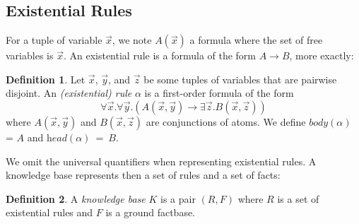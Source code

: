 \documentclass{article}
\newtheorem{proposition}{Proposition}[section]
\theoremstyle{definition}
\newtheorem{definition}{Definition}[section]
\theoremstyle{remark}
\begin{document}




\subsection{Existential Rules}

For a tuple of variable $\vec x$, we note $A(\vec x)$ a formula where the set of free variables is $\vec x$. An existential rule is a formula of the form $A \rightarrow B$, more exactly:

\begin{definition}
Let $\vec x$, $\vec y$, and $\vec z$ be some tuples of variables that are pairwise disjoint. An \emph{(existential) rule} $\alpha$ is a first-order formula	of the form $$\forall \vec x.\forall \vec y.( A(\vec x,\vec y) \rightarrow \exists \vec z. B(\vec x,\vec z))$$ where $A(\vec x,\vec y)$ and $B(\vec x,\vec z)$ are conjunctions of atoms. We define \emph{$\textit{body}(\alpha)$} = $A$ and \emph{$\textit{head}(\alpha)$}~=~$B$.
\end{definition}
We omit the universal quantifiers when representing existential rules. A knowledge base represents then a set of rules and a set of facts:

\begin{definition}
A \emph{knowledge base} $K$ is a pair $(R,F)$ where $R$ is a set of existential rules and $F$ is a  ground factbase.
\end{definition}
\end{document}
